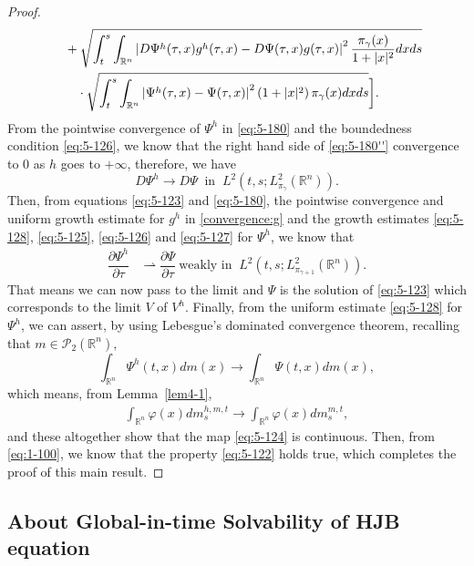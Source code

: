 \documentclass[11pt]{article}
\numberwithin{equation}{section}
\newcommand{\pr}{\mathcal{P}}
\newcommand{\brn}{{\mathbb{R}^n}}
\newcommand{\1}{\mbox{1\hspace{-1mm}I}}
\begin{document}
\begin{proof}
\begin{align}
    &\quad +\sqrt{\int_{t}^{s}\int_{\brn} \left|D\Psi^{h}(\tau,x) g^{h}(\tau,x) -D\Psi(\tau,x)g(\tau,x)\right|^2 \frac{\pi_{\gamma}(x)}{1+|x|^2} dxds} \notag \\
    &\qquad \cdot \sqrt{\int_{t}^{s}\int_{\brn} \left|\Psi^{h}(\tau,x)-\Psi(\tau,x)\right|^2\left(1+|x|^2\right) \pi_{\gamma}(x) dxds} \bigg]. \label{eq:5-180''}
\end{align}
From the pointwise convergence of $\Psi^h$ in \eqref{eq:5-180} and the boundedness condition \eqref{eq:5-126}, %
we know that the right hand side of \eqref{eq:5-180''} convergence to $0$ as $h$ goes to $+\infty$, therefore, we have
\begin{equation*}\label{eq:5-171}
    D\Psi^{h}\rightarrow D\Psi\ \text{ in }\ L^{2}\left(t,s;L_{\pi_{\gamma}}^{2}(\brn)\right).
\end{equation*}
Then, from equations \eqref{eq:5-123} and \eqref{eq:5-180}, the pointwise convergence and uniform growth estimate for $g^h$ in \eqref{convergence:g} and the growth estimates \eqref{eq:5-128}, \eqref{eq:5-125}, \eqref{eq:5-126} and \eqref{eq:5-127} for $\Psi^{h}$, we know that 
\begin{align*}
    \dfrac{\partial\Psi^{h}}{\partial\tau}&\rightharpoonup\dfrac{\partial\Psi}{\partial\tau}\ \text{weakly in }\ L^{2}\left(t,s;L_{\pi_{\gamma+1}}^{2}(\brn)\right). 
\end{align*}
That means we can now pass to the limit and $\Psi$ is the solution of \eqref{eq:5-123} which corresponds to the limit $V$ of $V^{h}$. Finally, from the uniform estimate \eqref{eq:5-128} for $\Psi^{h}$, we can assert, by using Lebesgue's dominated convergence theorem, recalling that $m\in\pr_2(\brn)$,
\begin{equation*}\label{eq:5-172}
    \int_{\brn}\Psi^{h}(t,x)dm(x)\rightarrow\int_{\brn}\Psi(t,x)dm(x),
\end{equation*}
which means, from Lemma~\ref{lem4-1},
\begin{align*}
    \int_{\brn}\varphi(x)dm^{h,m,t}_s\rightarrow\int_{\brn}\varphi(x)dm^{m,t}_s,
\end{align*}
and these altogether show that the map \eqref{eq:5-124} is continuous. Then, from \eqref{eq:1-100}, we know that the property \eqref{eq:5-122} holds true, which completes the proof of this main result. 
\end{proof}

\subsection{About Global-in-time Solvability of HJB equation}\label{subsec:global}
\end{document}
